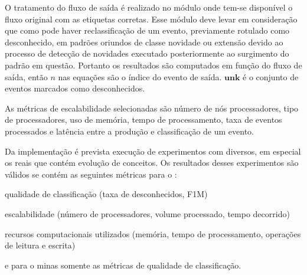 O tratamento do fluxo de saída é realizado no módulo \sink onde tem-se
disponível o fluxo original com as etiquetas corretas.
Esse módulo deve levar em consideração que
como pode haver reclassificação de um evento, previamente rotulado como
desconhecido, em padrões oriundos de classe novidade ou extensão devido ao
processo de detecção de novidades executado posteriormente ao surgimento
do padrão em questão.
Portanto os resultados são computados em função do fluxo de saída, então $n$ nas
equações são o índice do evento de saída.
$\mathbf{unk}$ é o conjunto de eventos marcados como desconhecidos.




As métricas de escalabilidade selecionadas são número de nós processadores, tipo
de processadores, uso de memória, tempo de processamento, taxa de eventos
processados e latência entre a produção e classificação de um evento.

Da implementação \mfog é prevista execução de experimentos com \datasets
diversos, em especial os \datasets reais que contém evolução de conceitos.
Os resultados desses experimentos são válidos se contém as seguintes métricas
para o \mfog: \begin{enumerate*}[label={\alph*)}]
  \item qualidade de classificação (taxa de desconhecidos, F1M)
  \item escalabilidade (número de processadores, volume processado, tempo decorrido)
  \item recursos computacionais utilizados (memória, tempo de processamento, operações de leitura e escrita)
\end{enumerate*}
e para o minas somente as métricas de qualidade de classificação.

